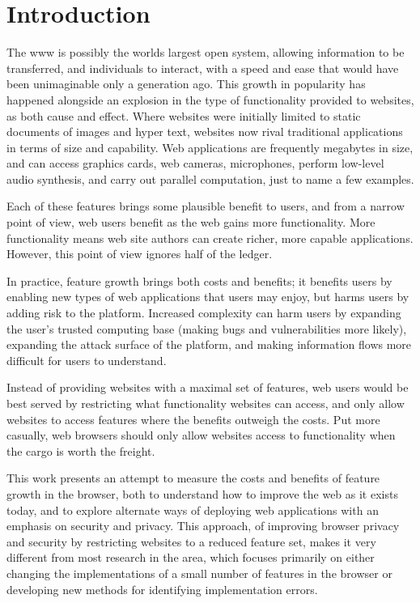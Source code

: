 \chapter{Introduction}
\label{intro}

The \gls{www} is possibly the worlds largest open system, allowing information
to be transferred, and individuals to interact, with a speed and ease that would
have been unimaginable only a generation ago.  This growth in popularity
has happened alongside an explosion in the type of functionality provided to
websites, as both cause and effect.  Where websites were initially limited
to static documents of images and hyper text, websites now rival traditional
applications in terms of size and capability.  Web applications are frequently
megabytes in size, and can access graphics cards, web cameras, microphones,
perform low-level audio synthesis, and carry out parallel computation, just to
name a few examples.

Each of these features brings some plausible benefit to users, and from a
narrow point of view, web users benefit as the web gains more functionality.
More functionality means web site authors can create richer, more capable
applications. However, this point of view ignores half of the ledger.

In practice, feature growth brings both costs and benefits; it benefits users
by enabling new types of web applications that users may enjoy, but
harms users by adding risk to the platform.  Increased complexity
can harm users by expanding the user's trusted computing base (making bugs and
vulnerabilities more likely), expanding the attack surface of the platform,
and making information flows more difficult for users to understand.

Instead of providing websites with a maximal set of features, web users would
be best served by restricting what functionality websites can access,
and only allow websites to access features where the benefits outweigh the
costs. Put more casually, web browsers should only allow websites access to
functionality when the cargo is worth the freight.

This work presents an attempt to measure the costs and benefits of feature
growth in the browser, both to understand how to improve the web as it exists
today, and to explore alternate ways of deploying web applications with
an emphasis on security and privacy.  This approach, of improving browser
privacy and security by restricting websites to a reduced feature set,
makes it very different from most research in the area, which focuses
primarily on either changing the implementations of a small number of features
in the browser or developing new methods for identifying implementation errors.





